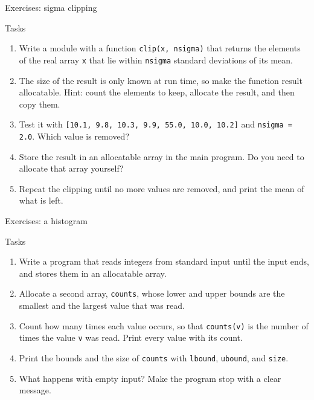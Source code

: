 \begin{frame}{Exercises: sigma clipping}
  \begin{block}{Tasks}
    \begin{enumerate}
      \item Write a module with a function \texttt{clip(x, nsigma)} that returns the elements of the real array \texttt{x} that lie within \texttt{nsigma} standard deviations of its mean.
      \item The size of the result is only known at run time, so make the function result allocatable. Hint: count the elements to keep, allocate the result, and then copy them.
      \item Test it with \mbox{\texttt{[10.1, 9.8, 10.3, 9.9, 55.0, 10.0, 10.2]}} and \texttt{nsigma = 2.0}. Which value is removed?
      \item Store the result in an allocatable array in the main program. Do you need to allocate that array yourself?
      \item Repeat the clipping until no more values are removed, and print the mean of what is left.
    \end{enumerate}
  \end{block}
\end{frame}


\begin{frame}{Exercises: a histogram}
  \begin{block}{Tasks}
    \begin{enumerate}
      \item Write a program that reads integers from standard input until the input ends, and stores them in an allocatable array.
      \item Allocate a second array, \texttt{counts}, whose lower and upper bounds are the smallest and the largest value that was read.
      \item Count how many times each value occurs, so that \texttt{counts(v)} is the number of times the value \texttt{v} was read. Print every value with its count.
      \item Print the bounds and the size of \texttt{counts} with \texttt{lbound}, \texttt{ubound}, and \texttt{size}.
      \item What happens with empty input? Make the program stop with a clear message.
    \end{enumerate}
  \end{block}
\end{frame}


